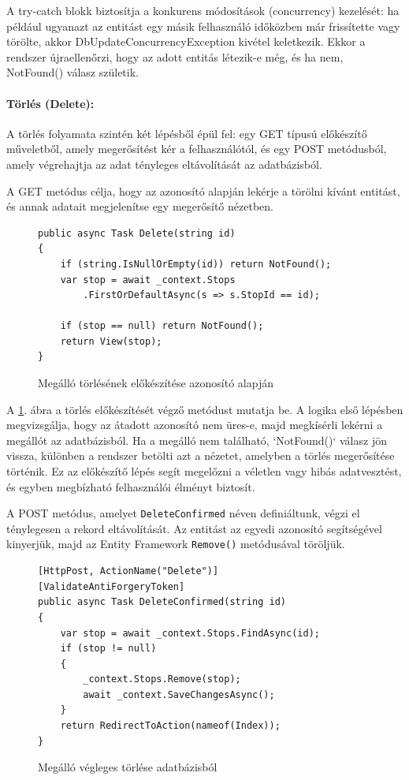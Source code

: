 A try-catch blokk biztosítja a konkurens módosítások (concurrency) kezelését: ha például ugyanazt az entitást egy másik felhasználó időközben már frissítette vagy törölte, akkor DbUpdateConcurrencyException kivétel keletkezik. Ekkor a rendszer újraellenőrzi, hogy az adott entitás létezik-e még, és ha nem, NotFound() válasz születik.

\paragraph{Törlés (Delete):}
A törlés folyamata szintén két lépésből épül fel: egy GET típusú előkészítő műveletből, amely megerősítést kér a felhasználótól, és egy POST metódusból, amely végrehajtja az adat tényleges eltávolítását az adatbázisból.

A GET metódus célja, hogy az azonosító alapján lekérje a törölni kívánt entitást, és annak adatait megjelenítse egy megerősítő nézetben.

\begin{figure}[H]
\caption{Megálló törlésének előkészítése azonosító alapján}
\label{fig:delete-stop-method}
\begin{minipage}{\textwidth}
\begin{BVerbatim}
public async Task Delete(string id)
{
    if (string.IsNullOrEmpty(id)) return NotFound();
    var stop = await _context.Stops
        .FirstOrDefaultAsync(s => s.StopId == id);

    if (stop == null) return NotFound();
    return View(stop);
}
\end{BVerbatim}
\end{minipage}
\end{figure}

A \ref{fig:delete-stop-method}. ábra a törlés előkészítését végző metódust mutatja be. A logika első lépésben megvizsgálja, hogy az átadott azonosító nem üres-e, majd megkísérli lekérni a megállót az adatbázisból. Ha a megálló nem található, `NotFound()` válasz jön vissza, különben a rendszer betölti azt a nézetet, amelyben a törlés megerősítése történik. Ez az előkészítő lépés segít megelőzni a véletlen vagy hibás adatvesztést, és egyben megbízható felhasználói élményt biztosít.


A POST metódus, amelyet \texttt{DeleteConfirmed} néven definiáltunk, végzi el ténylegesen a rekord eltávolítását. Az entitást az egyedi azonosító segítségével kinyerjük, majd az Entity Framework \texttt{Remove()} metódusával töröljük.

\begin{figure}[H]
\caption{Megálló végleges törlése adatbázisból}
\label{fig:delete-confirmed-method}
\begin{minipage}{\textwidth}
\begin{BVerbatim}
[HttpPost, ActionName("Delete")]
[ValidateAntiForgeryToken]
public async Task DeleteConfirmed(string id)
{
    var stop = await _context.Stops.FindAsync(id);
    if (stop != null)
    {
        _context.Stops.Remove(stop);
        await _context.SaveChangesAsync();
    }
    return RedirectToAction(nameof(Index));
}
\end{BVerbatim}
\end{minipage}
\end{figure}

